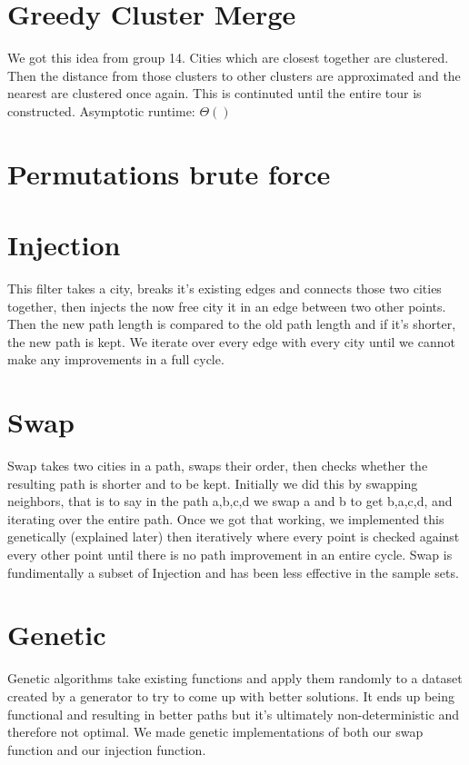 \documentclass{article}
\begin{document}
\section*{Greedy Cluster Merge}%
We got this idea from group 14. Cities which are closest together are clustered. Then the distance from those clusters to other clusters are approximated and the nearest are clustered once again. This is continuted until the entire tour is constructed. Asymptotic runtime: $\Theta ()$ 
\section*{Permutations brute force}%

\section*{Injection}%
This filter takes a city, breaks it's existing edges and connects those two cities together, then injects the now free city it in an edge between two other points. Then the new path length is compared to the old path length and if it's shorter, the new path is kept. We iterate over every edge with every city until we cannot make any improvements in a full cycle.

\section*{Swap}%
Swap takes two cities in a path, swaps their order, then checks whether the resulting path is shorter and to be kept. Initially we did this by swapping neighbors, that is to say in the path a,b,c,d we swap a and b to get b,a,c,d, and iterating over the entire path. Once we got that working, we implemented this genetically (explained later) then iteratively where every point is checked against every other point until there is no path improvement in an entire cycle. Swap is fundimentally a subset of Injection and has been less effective in the sample sets.

\section*{Genetic}
Genetic algorithms take existing functions and apply them randomly to a dataset created by a generator to try to come up with better solutions. It ends up being functional and resulting in better paths but it's ultimately non-deterministic and therefore not optimal. We made genetic implementations of both our swap function and our injection function.
\end{document}
